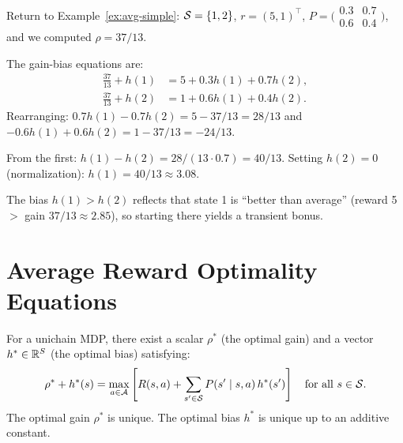 \documentclass[11pt,a4paper]{article}
\begin{document}
\begin{example}
\label{ex:gain-bias-compute}
Return to Example~\ref{ex:avg-simple}: $\mathcal{S} = \{1, 2\}$,
$r = (5, 1)^\top$, $P = \bigl(\begin{smallmatrix}
0.3 & 0.7 \\ 0.6 & 0.4 \end{smallmatrix}\bigr)$, and we
computed $\rho = 37/13$.

The gain-bias equations are:
\begin{align*}
    \frac{37}{13} + h(1) &= 5 + 0.3 h(1) + 0.7 h(2), \\
    \frac{37}{13} + h(2) &= 1 + 0.6 h(1) + 0.4 h(2).
\end{align*}
Rearranging: $0.7 h(1) - 0.7 h(2) = 5 - 37/13 = 28/13$ and
$-0.6 h(1) + 0.6 h(2) = 1 - 37/13 = -24/13$.

From the first: $h(1) - h(2) = 28/(13 \cdot 0.7) = 40/13$.
Setting $h(2) = 0$ (normalization): $h(1) = 40/13 \approx 3.08$.

The bias $h(1) > h(2)$ reflects that state 1 is ``better than
average'' (reward 5 $>$ gain $37/13 \approx 2.85$), so starting
there yields a transient bonus.
\end{example}


\section{Average Reward Optimality Equations}
\label{sec:avg-optimality}

\begin{theorem}
\label{thm:avg-optimality}
For a unichain MDP, there exist a scalar $\rho^*$ (the optimal gain)
and a vector $h^* \in \mathbb{R}^S$ (the optimal bias) satisfying:
\begin{equation}
\label{eq:avg-bellman-opt}
    \rho^* + h^*(s) = \max_{a \in \mathcal{A}}
    \left[ R(s,a) + \sum_{s' \in \mathcal{S}} P(s' \mid s,a)\, h^*(s')
    \right]
    \quad \text{for all } s \in \mathcal{S}.
\end{equation}
The optimal gain $\rho^*$ is unique. The optimal bias $h^*$ is unique
up to an additive constant.
\end{theorem}
\end{document}
